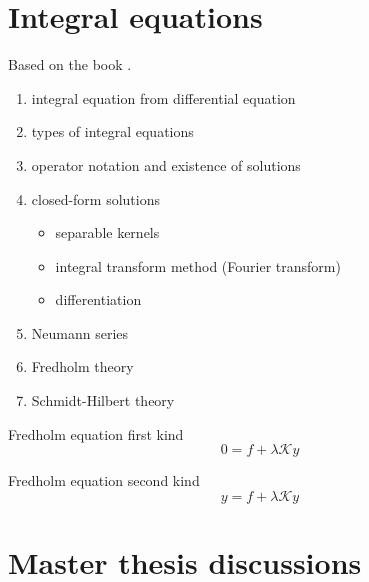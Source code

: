 \documentclass[../main/main.tex]{subfiles}
\begin{document}
\newpage
\section{Integral equations}
Based on the book \cite{Mmfp}.
\begin{enumerate}
\item integral equation from differential equation
\item types of integral equations
\item operator notation and existence of solutions
\item closed-form solutions
\begin{itemize}
\item separable kernels
\item integral transform method (Fourier transform)
\item differentiation
\end{itemize}

\item Neumann series
\item Fredholm theory
\item Schmidt-Hilbert theory
\end{enumerate}

Fredholm equation first kind
\begin{equation}
0 = f + \lambda \mathcal{K}y
\end{equation}

Fredholm equation second kind
\begin{equation}
y = f + \lambda \mathcal{K}y
\end{equation}


\newpage
\section{Master thesis discussions}
\end{document}
